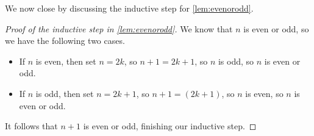 \documentclass[../notes.tex]{subfiles}
\begin{document}
We now close by discussing the inductive step for \autoref{lem:evenorodd}.
\begin{proof}[Proof of the inductive step in \autoref{lem:evenorodd}]
	We know that $n$ is even or odd, so we have the following two cases.
	\begin{itemize}
		\item If $n$ is even, then set $n=2k$, so $n+1=2k+1$, so $n$ is odd, so $n$ is even or odd.
		\item If $n$ is odd, then set $n=2k+1$, so $n+1=(2k+1)$, so $n$ is even, so $n$ is even or odd.
	\end{itemize}
	It follows that $n+1$ is even or odd, finishing our inductive step.
\end{proof}
\end{document}
